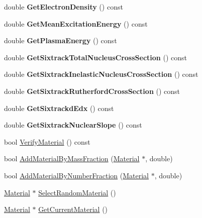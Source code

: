 \begin{DoxyCompactItemize}
double {\bfseries Get\+Electron\+Density} () const
\item 
\mbox{\label{classMaterialMixture_a9b24fe962a7fcc63130ca68ddc0ef7ff}} 
double {\bfseries Get\+Mean\+Excitation\+Energy} () const
\item 
\mbox{\label{classMaterialMixture_a84fd1bd444eb8075f7eae80fdc212f55}} 
double {\bfseries Get\+Plasma\+Energy} () const
\item 
\mbox{\label{classMaterialMixture_a9022f4e581e457de2028aecd5264c50d}} 
double {\bfseries Get\+Sixtrack\+Total\+Nucleus\+Cross\+Section} () const
\item 
\mbox{\label{classMaterialMixture_a4ba48f544f2580797b1471fce0d475c7}} 
double {\bfseries Get\+Sixtrack\+Inelastic\+Nucleus\+Cross\+Section} () const
\item 
\mbox{\label{classMaterialMixture_a233acb11f931beb3bd1c40b8743c5fc5}} 
double {\bfseries Get\+Sixtrack\+Rutherford\+Cross\+Section} () const
\item 
\mbox{\label{classMaterialMixture_a18c1b96dbbe0b9c519529c2643627c20}} 
double {\bfseries Get\+Sixtrackd\+Edx} () const
\item 
\mbox{\label{classMaterialMixture_a108b44df729e3278913d0f1ff4d25a8c}} 
double {\bfseries Get\+Sixtrack\+Nuclear\+Slope} () const
\item 
bool \hyperlink{classMaterialMixture_a9361444da7bc84a876b0a94e1bdba907}{Verify\+Material} () const
\item 
bool \hyperlink{classMaterialMixture_af45689244f830ba85046d7abec5125d1}{Add\+Material\+By\+Mass\+Fraction} (\hyperlink{classMaterial}{Material} $\ast$, double)
\item 
bool \hyperlink{classMaterialMixture_ac5de09e88622268d97d7d0ebe541d097}{Add\+Material\+By\+Number\+Fraction} (\hyperlink{classMaterial}{Material} $\ast$, double)
\item 
\hyperlink{classMaterial}{Material} $\ast$ \hyperlink{classMaterialMixture_af13d1230726a4b35b8bbe877f6322ca5}{Select\+Random\+Material} ()
\item 
\hyperlink{classMaterial}{Material} $\ast$ \hyperlink{classMaterialMixture_a79fdfceeff97e4df6ddf90bbaecea148}{Get\+Current\+Material} ()

\end{DoxyCompactItemize}
